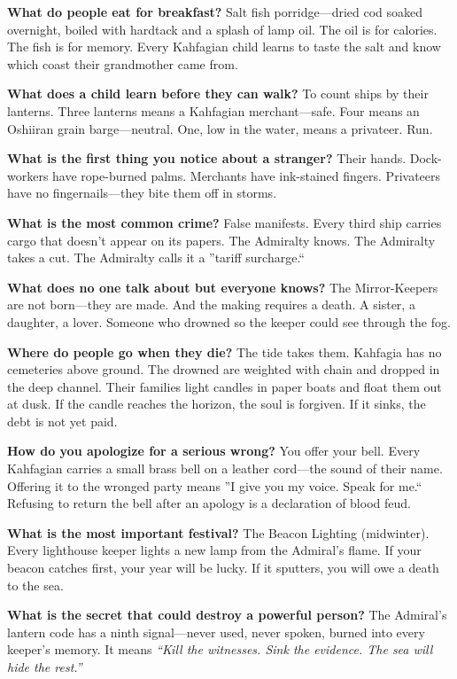 \vspace{1em}

\begin{almanac}
\textbf{What do people eat for breakfast?} Salt fish porridge---dried cod soaked overnight, boiled with hardtack and a splash of lamp oil. The oil is for calories. The fish is for memory. Every Kahfagian child learns to taste the salt and know which coast their grandmother came from.

\textbf{What does a child learn before they can walk?} To count ships by their lanterns. Three lanterns means a Kahfagian merchant---safe. Four means an Oshiiran grain barge---neutral. One, low in the water, means a privateer. Run.

\textbf{What is the first thing you notice about a stranger?} Their hands. Dock-workers have rope-burned palms. Merchants have ink-stained fingers. Privateers have no fingernails---they bite them off in storms.

\textbf{What is the most common crime?} False manifests. Every third ship carries cargo that doesn't appear on its papers. The Admiralty knows. The Admiralty takes a cut. The Admiralty calls it a ''tariff surcharge.``

\textbf{What does no one talk about but everyone knows?} The Mirror-Keepers are not born---they are made. And the making requires a death. A sister, a daughter, a lover. Someone who drowned so the keeper could see through the fog.

\textbf{Where do people go when they die?} The tide takes them. Kahfagia has no cemeteries above ground. The drowned are weighted with chain and dropped in the deep channel. Their families light candles in paper boats and float them out at dusk. If the candle reaches the horizon, the soul is forgiven. If it sinks, the debt is not yet paid.

\textbf{How do you apologize for a serious wrong?} You offer your bell. Every Kahfagian carries a small brass bell on a leather cord---the sound of their name. Offering it to the wronged party means ''I give you my voice. Speak for me.`` Refusing to return the bell after an apology is a declaration of blood feud.

\textbf{What is the most important festival?} The Beacon Lighting (midwinter). Every lighthouse keeper lights a new lamp from the Admiral's flame. If your beacon catches first, your year will be lucky. If it sputters, you will owe a death to the sea.

\textbf{What is the secret that could destroy a powerful person?} The Admiral's lantern code has a ninth signal---never used, never spoken, burned into every keeper's memory. It means \textit{``Kill the witnesses. Sink the evidence. The sea will hide the rest.''}
\end{almanac}

